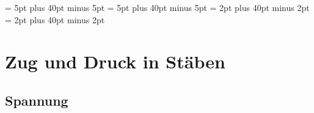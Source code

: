 \documentclass[11pt]{article}
\newcommand{\1}{ {\mathds{1}} }
\begin{document}
		\abovedisplayskip = 5pt plus 40pt minus 5pt
		\belowdisplayskip = 5pt plus 40pt minus 5pt
		\abovedisplayshortskip = 2pt plus 40pt minus 2pt
		\belowdisplayshortskip = 2pt plus 40pt minus 2pt
		\pagestyle{fancy}
		
		\tableofcontents
		\pagebreak


		\section{Zug und Druck in Stäben}
		\subsection{Spannung} %
\end{document}
